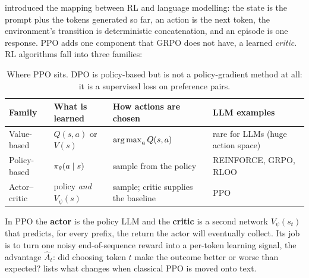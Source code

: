  introduced the mapping between RL and language modelling: the state is the prompt
plus the tokens generated so far, an action is the next token, the environment's transition is
deterministic concatenation, and an episode is one response. PPO adds one component that GRPO
does not have, a learned \emph{critic}. RL algorithms fall into three families:

\begin{table}[h]
\centering\small
\begin{tabularx}{\linewidth}{@{}lXXl@{}}
\toprule
\textbf{Family} & \textbf{What is learned} & \textbf{How actions are chosen} & \textbf{LLM examples}\\
\midrule
Value-based & $Q(s,a)$ or $V(s)$ & $\operatorname*{arg\,max}_a Q(s,a)$ & rare for LLMs (huge action space)\\
Policy-based & $\pi_\theta(a\mid s)$ & sample from the policy & REINFORCE, GRPO, RLOO\\
Actor--critic & policy \emph{and} $V_\psi(s)$ & sample; critic supplies the baseline & PPO\\
\bottomrule
\end{tabularx}
\caption{Where PPO sits. DPO is policy-based but is not a policy-gradient method at all: it is a
supervised loss on preference pairs.}
\label{tab:rlhf:families}
\end{table}

In PPO the \textbf{actor} is the policy LLM and the \textbf{critic} is a second network
$V_\psi(s_t)$ that predicts, for every prefix, the return the actor will eventually collect.
Its job is to turn one noisy end-of-sequence reward into a per-token learning signal, the
advantage $\hat A_t$: did choosing token $t$ make the outcome better or worse than expected?
 lists what changes when classical PPO is moved onto text.

